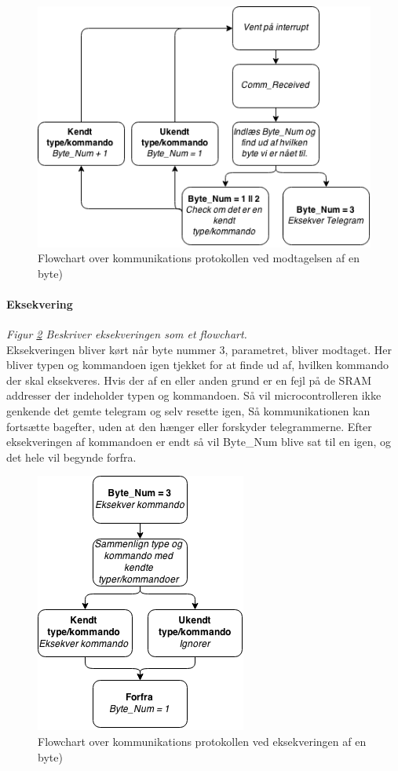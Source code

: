 \begin{figure}[p]

	\centering
		\includegraphics[scale=0.8]{Billeder/Comm_Modtagelse.png}
	\caption{Flowchart over kommunikations protokollen ved modtagelsen af en byte)}
	\label{fig:Comm_Modtagelse}
	
\end{figure}

\paragraph{Eksekvering} 
\textit{Figur \ref{fig:Comm_Eksekvering} Beskriver eksekveringen som et flowchart.} \\
Eksekveringen bliver kørt når byte nummer 3, parametret, bliver modtaget. Her bliver typen og kommandoen igen tjekket for at finde ud af, hvilken kommando der skal eksekveres. Hvis der af en eller anden grund er en fejl på de SRAM addresser der indeholder typen og kommandoen. Så vil microcontrolleren ikke genkende det gemte telegram og selv resette igen, Så kommunikationen kan fortsætte bagefter, uden at den hænger eller forskyder telegrammerne. Efter eksekveringen af kommandoen er endt så vil Byte\_Num blive sat til en igen, og det hele vil begynde forfra.

\begin{figure}[p]

	\centering
		\includegraphics[scale=0.8]{Billeder/Comm_Eksekvering.png}
	\caption{Flowchart over kommunikations protokollen ved eksekveringen af en byte)}
	\label{fig:Comm_Eksekvering}
	
\end{figure}

